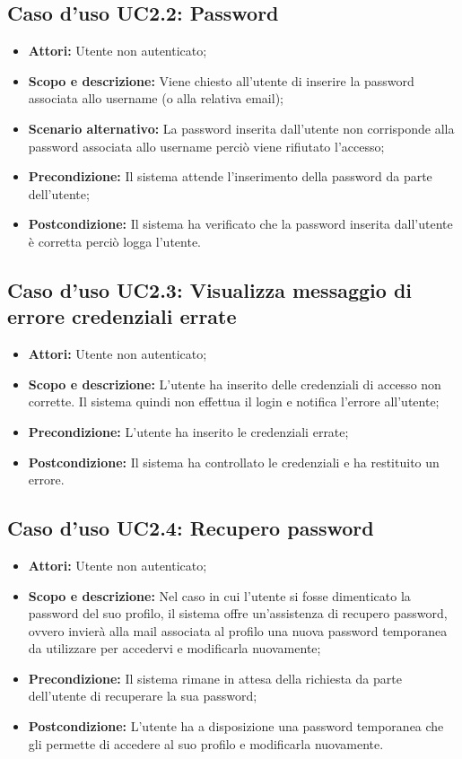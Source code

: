 \documentclass[12pt,a4paper,titlepage]{article}
\begin{document}
	\subsection{Caso d'uso UC2.2: Password}
	\label{UC2.2}
	\begin{itemize}
		\item \textbf{Attori: }Utente non autenticato;
		\item \textbf{Scopo e descrizione: }Viene chiesto all'utente di inserire la password associata allo username (o alla relativa email);
		\item \textbf{Scenario alternativo: }La password inserita dall'utente non corrisponde alla password associata allo username perciò viene rifiutato l'accesso;
		\item \textbf{Precondizione: }Il sistema attende l'inserimento della password da parte dell'utente;
		\item \textbf{Postcondizione: }Il sistema ha verificato che la password inserita dall'utente è corretta perciò logga l'utente.
	\end{itemize}
	\subsection{Caso d'uso UC2.3: Visualizza messaggio di errore credenziali errate}
	\label{UC2.3}
	\begin{itemize}
		\item \textbf{Attori: }Utente non autenticato;
		\item \textbf{Scopo e descrizione: }L'utente ha inserito delle credenziali di accesso non corrette. Il sistema quindi non effettua il login e notifica l'errore all'utente;
		\item \textbf{Precondizione: }L'utente ha inserito le credenziali errate;
		\item \textbf{Postcondizione: }Il sistema ha controllato le credenziali e ha restituito un errore.
	\end{itemize}
	\subsection{Caso d'uso UC2.4: Recupero password}
	\label{UC2.4}
	\begin{itemize}
		\item \textbf{Attori: }Utente non autenticato;
		\item \textbf{Scopo e descrizione: }Nel caso in cui l'utente si fosse dimenticato la password del suo profilo, il sistema offre un'assistenza di recupero password, ovvero invierà alla mail associata al profilo una nuova password temporanea da utilizzare per accedervi e modificarla nuovamente;
		\item \textbf{Precondizione: }Il sistema rimane in attesa della richiesta da parte dell'utente di recuperare la sua password;
		\item \textbf{Postcondizione: }L'utente ha a disposizione una password temporanea che gli permette di accedere al suo profilo e modificarla nuovamente.
	\end{itemize}
\end{document}

